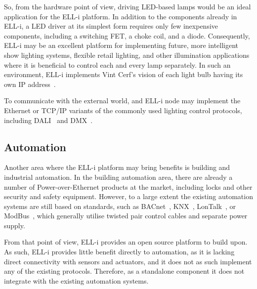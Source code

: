 \documentclass[final]{siamltex}
\begin{document}

So, from the hardware point of view, driving LED-based lamps would be an
ideal application for the ELL-i platform.  In addition to the
components already in ELL-i, a LED driver at its simplest form
requires only few inexpensive components, including a switching
FET, a choke coil, and a diode.
Consequently, ELL-i may be an excellent platform for implementing
future, more intelligent show lighting systems, flexible retail
lighting, and other illumination applications where it is beneficial
to control each and every lamp separately.  In such an environment,
ELL-i implements Vint Cerf's vision of each light bulb having its own
IP address~\cite{cerf1997next}.

To communicate with the external world, and ELL-i node may implement the
Ethernet or TCP/IP variants of the commonly used lighting control protocols,
including DALI~\cite{manual2001digital} and DMX~\cite{bennette1994recommended}.


\subsection{Automation}

Another area where the ELL-i platform may bring benefits is building
and industrial automation.  In the building automation area, there are
already a number of Power-over-Ethernet products at the market,
including locks and other security and safety equipment.  However, to
a large extent the existing automation systems are still based on
standards, such as BACnet~\cite{bushby1997bacnet}, KNX~\cite{knx2011knx},
LonTalk~\cite{LonTalk}, or ModBus~\cite{ModBus},
which generally utilise twisted pair
control cables and separate power supply.

From that point of view, ELL-i provides an open source platform to
build upon.  As such, ELL-i provides little benefit directly to
automation, as it is lacking direct connectivity with sensors and
actuators, and it does not as such implement any of the existing
protocols.  Therefore, as a standalone component it does not integrate
with the existing automation systems.
\end{document}
